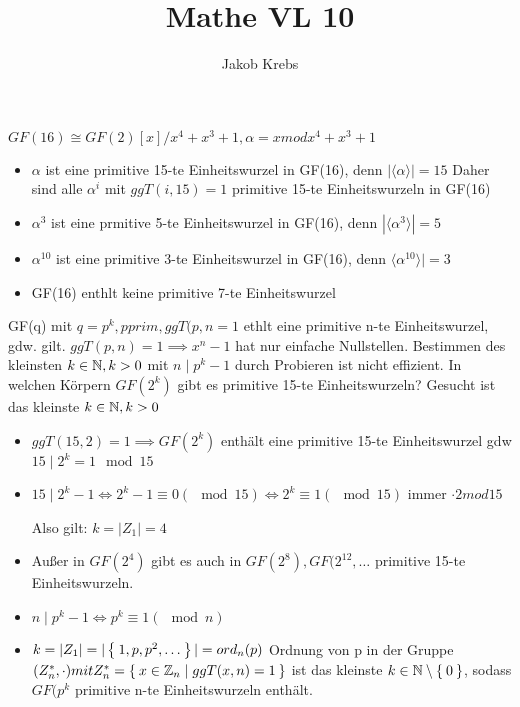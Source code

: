 \documentclass{../tudscript}
\author{Jakob Krebs}
\title{Mathe VL 10}
\begin{document}
$GF(16) \cong GF(2)[x]/x^4+x^3+1, \alpha = x mod x^4+x^3+1$

\begin{itemize}
\item $\alpha$ ist eine primitive 15-te Einheitswurzel in GF(16), denn $|\langle \alpha \rangle| = 15$
  Daher sind alle $\alpha^i$ mit $ggT(i, 15) = 1$ primitive 15-te Einheitswurzeln in GF(16)
\item $\alpha^3$ ist eine prmitive 5-te Einheitswurzel in GF(16), denn $|\langle \alpha^3 \rangle| = 5$
\item $\alpha^{10}$ ist eine primitive 3-te Einheitswurzel in GF(16), denn $\langle \alpha^{10} \rangle | = 3$
\item GF(16) enthlt keine primitive 7-te Einheitswurzel
\end{itemize}

 GF(q) mit $q = p^k, p prim, ggT(p, n = 1$ ethlt eine primitive n-te Einheitswurzel, gdw.
gilt.
$ggT(p, n) = 1 \implies x^n -1$ hat nur einfache Nullstellen.
Bestimmen des kleinsten $k \in \mathbb{N}, k > 0$ mit $n \mid p^k -1$ durch Probieren ist nicht effizient.
In welchen Körpern $GF(2^k)$ gibt es primitive 15-te Einheitswurzeln?
Gesucht ist das kleinste $k \in \mathbb{N}, k >0$

\begin{itemize}
\item $ggT(15,2) = 1 \implies GF(2^k)$ enthält eine primitive 15-te Einheitswurzel gdw $15 \mid 2^k = 1 \mod 15$
\item $15 \mid 2^k -1 \iff 2^k -1 \equiv 0 (\mod 15) \iff 2^k \equiv 1 (\mod 15)$
  immer $\cdot 2 mod 15$

  Also gilt: $k = |Z_1| = 4$
\item Außer in $GF(2^4)$ gibt es auch in $GF(2^8), GF(2^12, \ldots$ primitive 15-te Einheitswurzeln.
  \end{itemize}

\begin{itemize}
\item $n \mid p^k -1 \iff p^k \equiv 1 (\mod n)$
\item $k = |Z_1| = |\Set{1, p, p^2, \ldots}| = ord_n (p)$ Ordnung von p in der Gruppe $(Z_{n}^{*}, \cdot) mit Z_{n}^* = \Set{x \in \mathbb{Z}_n \mid ggT(x, n) = 1}$
  ist das kleinste $k \in \mathbb{N} \setminus \Set{0}$, sodass $GF(p^k$ primitive n-te Einheitswurzeln enthält.
\end{itemize}
\end{document}

